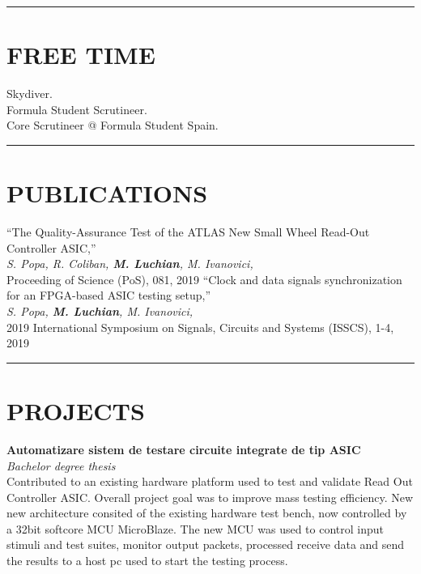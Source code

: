 \documentclass{resume}
\begin{document}
\begin{resume}
\noindent\rule{\textwidth}{0.4pt}
\section{FREE TIME} 
\vspace{0.1in} 

Skydiver.\\
Formula Student Scrutineer.\\
Core Scrutineer @ Formula Student Spain.\\

\noindent\rule{\textwidth}{0.4pt}
\section{PUBLICATIONS} 
\vspace{0.1in}

``The Quality-Assurance Test of the ATLAS New Small Wheel Read-Out Controller ASIC,''\\
{\it S. Popa, R. Coliban, {\bf M. Luchian}, M. Ivanovici,}\\
Proceeding of Science (PoS), 081, 2019
``Clock and data signals synchronization for an FPGA-based ASIC testing setup,''\\ 
{\it S. Popa, {\bf M. Luchian}, M. Ivanovici,}\\ 
2019 International Symposium on Signals, Circuits and Systems (ISSCS), 1-4, 2019\\
\noindent\rule{\textwidth}{0.4pt}
\section{PROJECTS} 
\vspace{0.1in} 
   
    {\bf Automatizare sistem de testare circuite integrate de tip ASIC}\\
    {\it Bachelor degree thesis} \\
    Contributed to an existing hardware platform used to test and validate Read Out Controller ASIC.
    Overall project goal was to improve mass testing efficiency. New new architecture consited of the existing 
    hardware test bench, now controlled by a 32bit softcore MCU MicroBlaze. The new MCU was used to control input stimuli and
    test suites, monitor output packets, processed receive data and send the results to a host pc used to start the testing process.


\end{resume}
\end{document}
